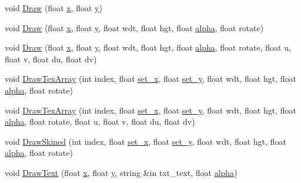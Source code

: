 \begin{DoxyCompactItemize}
void \hyperlink{class_g_u_i_label_a6582906b6f8dd52569f905a797ca52a4}{Draw} (float \hyperlink{class_g_u_i_label_afc04a00a1336cec1bb6a94f62443e51b}{x}, float \hyperlink{class_g_u_i_label_aa302d2303602c024f203dda2ac6de0d9}{y})
\item 
void \hyperlink{class_g_u_i_label_a3bb94d2cefb83f76eb8874930a12e0f4}{Draw} (float \hyperlink{class_g_u_i_label_afc04a00a1336cec1bb6a94f62443e51b}{x}, float \hyperlink{class_g_u_i_label_aa302d2303602c024f203dda2ac6de0d9}{y}, float wdt, float hgt, float \hyperlink{class_g_u_i_label_a033d064957f88cd4ebcea6c483af6984}{alpha}, float rotate)
\item 
void \hyperlink{class_g_u_i_label_af0943185a89553a1eccd44e5dd59524a}{Draw} (float \hyperlink{class_g_u_i_label_afc04a00a1336cec1bb6a94f62443e51b}{x}, float \hyperlink{class_g_u_i_label_aa302d2303602c024f203dda2ac6de0d9}{y}, float wdt, float hgt, float \hyperlink{class_g_u_i_label_a033d064957f88cd4ebcea6c483af6984}{alpha}, float rotate, float u, float v, float du, float dv)
\item 
void \hyperlink{class_g_u_i_label_a35f140c926c433eefbdadb3fa6a10336}{Draw\+Tex\+Array} (int index, float \hyperlink{class_g_u_i_label_a94ff861ea98f1ba34d3795ae8db00776}{set\+\_\+x}, float \hyperlink{class_g_u_i_label_a207dfc2274970c99eb0a92fa2170da90}{set\+\_\+y}, float wdt, float hgt, float \hyperlink{class_g_u_i_label_a033d064957f88cd4ebcea6c483af6984}{alpha}, float rotate)
\item 
void \hyperlink{class_g_u_i_label_ac8f8a84d61cd688de9b7b2eb4be97bab}{Draw\+Tex\+Array} (int index, float \hyperlink{class_g_u_i_label_a94ff861ea98f1ba34d3795ae8db00776}{set\+\_\+x}, float \hyperlink{class_g_u_i_label_a207dfc2274970c99eb0a92fa2170da90}{set\+\_\+y}, float wdt, float hgt, float \hyperlink{class_g_u_i_label_a033d064957f88cd4ebcea6c483af6984}{alpha}, float rotate, float u, float v, float du, float dv)
\item 
void \hyperlink{class_g_u_i_label_a5c60113de47ea19a45e8d1efd48c6400}{Draw\+Skined} (int index, float \hyperlink{class_g_u_i_label_a94ff861ea98f1ba34d3795ae8db00776}{set\+\_\+x}, float \hyperlink{class_g_u_i_label_a207dfc2274970c99eb0a92fa2170da90}{set\+\_\+y}, float wdt, float hgt, float \hyperlink{class_g_u_i_label_a033d064957f88cd4ebcea6c483af6984}{alpha}, float rotate)
\item 
void \hyperlink{class_g_u_i_label_a00fc5b5e6000000dd1a8b8c45a63f018}{Draw\+Text} (float \hyperlink{class_g_u_i_label_afc04a00a1336cec1bb6a94f62443e51b}{x}, float \hyperlink{class_g_u_i_label_aa302d2303602c024f203dda2ac6de0d9}{y}, string \&in txt\+\_\+text, float \hyperlink{class_g_u_i_label_a033d064957f88cd4ebcea6c483af6984}{alpha})

\end{DoxyCompactItemize}
